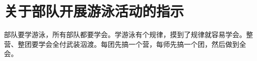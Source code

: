 \section[关于部队开展游泳活动的指示（一九六四年七月二日）]{关于部队开展游泳活动的指示}


部队要学游泳，所有部队都要学会。学游泳有个规律，摸到了规律就容易学会。整营、整团要学会全付武装泅渡。每团先搞一个营，每师先搞一个团，然后做到全会。

